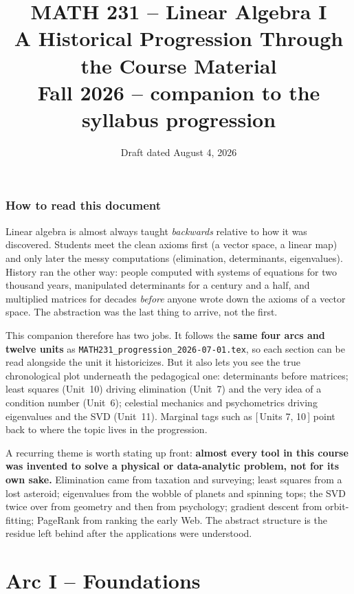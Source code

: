 \documentclass[11pt]{article}
\title{\vspace{-1.2cm}\textbf{\sffamily MATH 231 -- Linear Algebra I}\\[4pt]
       {\large\sffamily A Historical Progression Through the Course Material}\\[2pt]
       {\normalsize\sffamily Fall 2026 -- companion to the syllabus progression}}
\author{}
\date{\normalsize\sffamily Draft dated August 4, 2026}
\newcommand{\unit}[1]{{\footnotesize\sffamily\color{RoyalBlue}[\,#1\,]}}
\begin{document}
\maketitle
\vspace{-1.0cm}

\section*{How to read this document}
Linear algebra is almost always taught \emph{backwards} relative to how it was
discovered. Students meet the clean axioms first (a vector space, a linear map)
and only later the messy computations (elimination, determinants, eigenvalues).
History ran the other way: people computed with systems of equations for two
thousand years, manipulated determinants for a century and a half, and multiplied
matrices for decades \emph{before} anyone wrote down the axioms of a vector space.
The abstraction was the last thing to arrive, not the first.

This companion therefore has two jobs. It follows the \textbf{same four arcs and
twelve units} as \texttt{MATH231\_progression\_2026-07-01.tex}, so each section can
be read alongside the unit it historicizes. But it also lets you see the true
chronological plot underneath the pedagogical one: determinants before matrices;
least squares (Unit~10) driving elimination (Unit~7) and the very idea of a
condition number (Unit~6); celestial mechanics and psychometrics driving
eigenvalues and the SVD (Unit~11). Marginal tags such as \unit{Units 7, 10} point
back to where the topic lives in the progression.

A recurring theme is worth stating up front: \textbf{almost every tool in this
course was invented to solve a physical or data-analytic problem, not for its own
sake.} Elimination came from taxation and surveying; least squares from a lost
asteroid; eigenvalues from the wobble of planets and spinning tops; the SVD twice
over from geometry and then from psychology; gradient descent from orbit-fitting;
PageRank from ranking the early Web. The abstract structure is the residue left
behind after the applications were understood.

\part*{Arc I -- Foundations}
\end{document}
